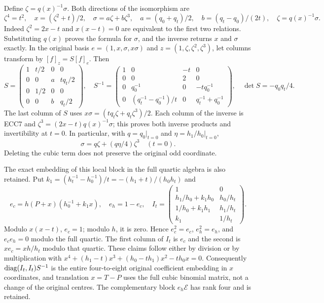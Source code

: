 \documentclass[11pt]{article}
\begin{document}
Define $\zeta=q(x)^{-1}\sigma$. Both directions of the isomorphism are
\begin{equation}
 \zeta^4=t^2,\quad x=(\zeta^2+t)/2,\quad
 \sigma=a\zeta+b\zeta^3,\quad
 a=(q_0+q_t)/2,\quad b=(q_t-q_0)/(2t),\quad
 \zeta=q(x)^{-1}\sigma.
 \tag{ECC8}
\end{equation}
Indeed $\zeta^2=2x-t$ and $x(x-t)=0$ are equivalent to the first two
relations. Substituting $q(x)$ proves the formula for $\sigma$, and
the inverse returns $x$ and $\sigma$ exactly. In the original basis
$e=(1,x,\sigma,x\sigma)$ and $z=(1,\zeta,\zeta^2,\zeta^3)$, let columns
transform by $[f]_z=S[f]_e$. Then
\begin{equation}
 S=\begin{pmatrix}1&t/2&0&0\\0&0&a&tq_t/2\\
 0&1/2&0&0\\0&0&b&q_t/2\end{pmatrix},\quad
 S^{-1}=\begin{pmatrix}
 1&0&-t&0\\0&0&2&0\\
 0&q_0^{-1}&0&-tq_0^{-1}\\
 0&(q_t^{-1}-q_0^{-1})/t&0&q_t^{-1}+q_0^{-1}
 \end{pmatrix},\quad \det S=-q_0q_t/4.
 \tag{ECC9}
\end{equation}
The last column of $S$ uses $x\sigma=(tq_t\zeta+q_t\zeta^3)/2$.
Each column of the inverse is ECC7 and
$\zeta^3=(2x-t)q(x)^{-1}\sigma$; this proves both inverse products and
invertibility at $t=0$. In particular, with $q=q_0|_{t=0}$ and
$\eta=h_1/h_0|_{t=0}$,
\begin{equation}
 \sigma=q\zeta+(q\eta/4)\zeta^3\quad(t=0).
 \tag{ECC10}
\end{equation}
Deleting the cubic term does not preserve the original odd coordinate.

The exact embedding of this local block in the full quartic algebra is
also retained. Put
$k_1=(h_t^{-1}-h_0^{-1})/t=-(h_1+t)/(h_0h_t)$ and
\begin{equation}
 e_c=h(P+x)(h_0^{-1}+k_1x),\quad e_h=1-e_c,\quad
 I_t=\begin{pmatrix}
 1&0\\h_1/h_0+k_1h_0&h_0/h_t\\
 1/h_0+k_1h_1&h_1/h_t\\k_1&1/h_t
 \end{pmatrix}.
 \tag{ECC11}
\end{equation}
Modulo $x(x-t)$, $e_c=1$; modulo $h$, it is zero. Hence $e_c^2=e_c$,
$e_h^2=e_h$, and $e_ce_h=0$ modulo the full quartic. The first column of
$I_t$ is $e_c$ and the second is $xe_c=xh/h_t$ modulo that quartic.
These claims follow either by division or by multiplication with
$x^4+(h_1-t)x^3+(h_0-th_1)x^2-th_0x=0$.
Consequently $\operatorname{diag}(I_t,I_t)S^{-1}$ is the entire four-to-eight original
coefficient embedding in $x$ coordinates, and translation $x=T-P$ uses
the full cubic binomial matrix, not a change of the original centres.
The complementary block $e_h\mathscr E$ has rank four and is retained.
\end{document}
